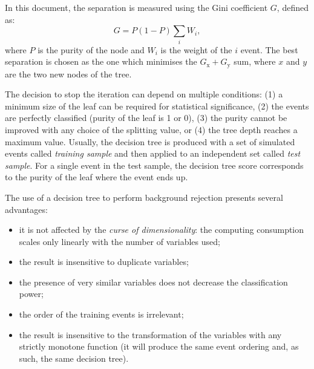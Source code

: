 In this document, the separation is measured using the Gini coefficient $G$, defined as:
\begin{equation}
    G = P(1-P)\sum_i W_i,
\end{equation}
where $P$ is the purity of the node and $W_i$ is the weight of the $i$ event. The best separation is chosen as the one which minimises the $G_{\mathrm{x}}+G_{\mathrm{y}}$ sum, where $x$ and $y$ are the two new nodes of the tree.

The decision to stop the iteration can depend on multiple conditions: (1) a minimum size of the leaf can be required for statistical significance, (2) the events are perfectly classified (purity of the leaf is 1 or 0), (3) the purity cannot be improved with any choice of the splitting value, or (4) the tree depth reaches a maximum value. 
Usually, the decision tree is produced with a set of simulated events called \emph{training sample} and then applied to an independent set called \emph{test sample}.
For a single event in the test sample, the decision tree score corresponds to the purity of the leaf where the event ends up. 

The use of a decision tree to perform background rejection presents several advantages: 
\begin{itemize}
    \item it is not affected by the \emph{curse of dimensionality}: the computing consumption scales only linearly with the number of variables used;
    \item the result is insensitive to duplicate variables;
    \item the presence of very similar variables does not decrease the classification power;
    \item the order of the training events is irrelevant;
    \item the result is insensitive to the transformation of the variables with any strictly monotone function (it will produce the same event ordering and, as such, the same decision tree).
\end{itemize}

